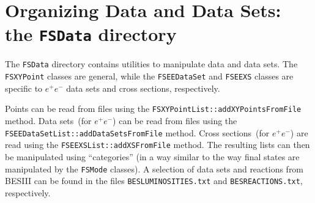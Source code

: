 \documentclass[11pt]{article}
\begin{document}
\section{Organizing Data and Data Sets: the {\tt FSData} directory}

The {\tt FSData} directory contains utilities to manipulate data and data sets.  The {\tt FSXYPoint} classes are general, while the {\tt FSEEDataSet} and {\tt FSEEXS} classes are specific to $e^+e^-$ data sets and cross sections, respectively.

Points can be read from files using the {\tt FSXYPointList::addXYPointsFromFile} method.
Data sets~(for $e^+e^-$) can be read from files using the {\tt FSEEDataSetList::addDataSetsFromFile} method.  Cross sections~(for $e^+e^-$) are read using the {\tt FSEEXSList::addXSFromFile} method.  The resulting lists can then be manipulated using ``categories'' (in a way similar to the way final states are manipulated by the {\tt FSMode} classes).  A selection of data sets and reactions from BESIII can be found in the files {\tt BESLUMINOSITIES.txt} and {\tt BESREACTIONS.txt}, respectively.
\end{document}
